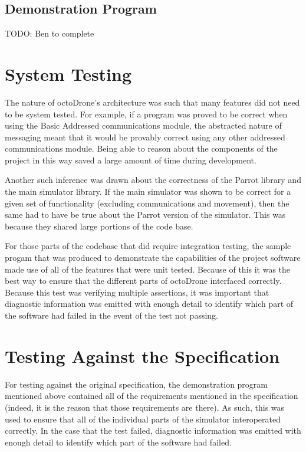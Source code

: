 \subsection{Demonstration Program}
TODO: Ben to complete

\section{System Testing}
The nature of octoDrone's architecture was such that many features did not need to be system tested. For example, if a program was proved to be correct when using the Basic Addressed communications module, the abstracted nature of messaging meant that it would be provably correct using any other addressed communications module. Being able to reason about the components of the project in this way saved a large amount of time during development.

Another such inference was drawn about the correctness of the Parrot library and the main simulator library. If the main simulator was shown to be correct for a given set of functionality (excluding communications and movement), then the same had to have be true about the Parrot version of the simulator. This was because they shared large portions of the code base.

For those parts of the codebase that did require integration testing, the sample progam that was produced to demonstrate the capabilities of the project software made use of all of the features that were unit tested. Because of this it was the best way to ensure that the different parts of octoDrone interfaced correctly. Because this test was verifying multiple assertions, it was important that diagnostic information was emitted with enough detail to identify which part of the software had failed in the event of the test not passing.

\section{Testing Against the Specification}
For testing against the original specification, the demonstration program mentioned above contained all of the requirements mentioned in the specification (indeed, it is the reason that those requirements are there). As such, this was used to ensure that all of the individual parts of the simulator interoperated correctly. In the case that the test failed, diagnostic information was emitted with enough detail to identify which part of the software had failed.
